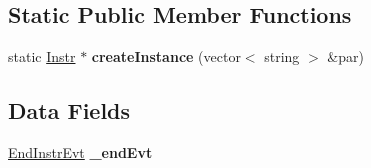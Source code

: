 \subsection*{Static Public Member Functions}
\begin{DoxyCompactItemize}
\item 
static \hyperlink{classRTSim_1_1Instr}{Instr} $\ast$ {\bfseries create\+Instance} (vector$<$ string $>$ \&par)\hypertarget{classRTSim_1_1ExecInstr_a5d2dd06c62a259283b40e35af0940260}{}\label{classRTSim_1_1ExecInstr_a5d2dd06c62a259283b40e35af0940260}

\end{DoxyCompactItemize}
\subsection*{Data Fields}
\begin{DoxyCompactItemize}
\item 
\hyperlink{classRTSim_1_1EndInstrEvt}{End\+Instr\+Evt} {\bfseries \+\_\+end\+Evt}\hypertarget{classRTSim_1_1ExecInstr_a3d84bbb75da7c0f1c0b95c72a27b3c73}{}\label{classRTSim_1_1ExecInstr_a3d84bbb75da7c0f1c0b95c72a27b3c73}

\end{DoxyCompactItemize}

